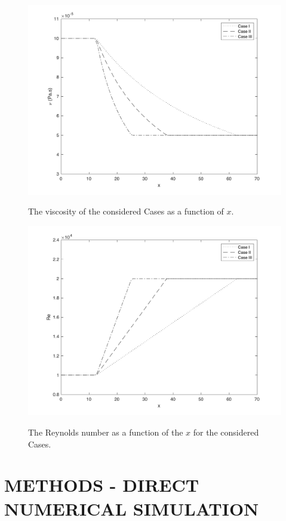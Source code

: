 \documentclass[twocolumn,10pt]{asme2e}
\begin{document}
\begin{figure}[!htbp]
	\centering
	\scalebox{0.5}
	{\includegraphics{viscosity.pdf}}
	\caption{The viscosity of the considered Cases as a function of \(x\).}
	\label{fig:viscosity}
	\end{figure}

\begin{figure}[!htbp]
	\centering
	\scalebox{0.5}
	{\includegraphics{reynolds.pdf}}
	\caption{The Reynolds number as a function of the \(x\) for the considered Cases.}
	\label{fig:reynolds}
\end{figure}

\section*{METHODS - DIRECT NUMERICAL SIMULATION}
\end{document}

